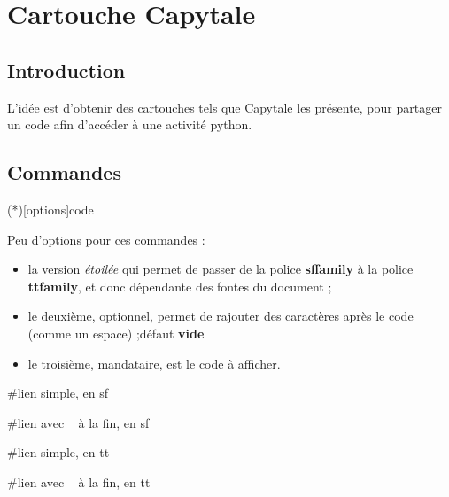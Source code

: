 \documentclass{article}
\newcommand\Cle[1]{{\bfseries\sffamily\textlangle #1\textrangle}}
\begin{document}
\newpage

\section{Cartouche Capytale}

\subsection{Introduction}

\begin{codeidee}
L'idée est d'obtenir des \textsf{cartouches} tels que \textsf{Capytale} les présente, pour partager un code afin d'accéder à une activité \textsf{python}.
\end{codeidee}

\subsection{Commandes}

\begin{codetex}
\liencapytale(*)[options]{code}
\end{codetex}

\begin{codecles}
Peu d'options pour ces commandes :

\begin{itemize}
	\item la version \textit{étoilée} qui permet de  passer de la police \Cle{sffamily} à la police \Cle{ttfamily}, et donc dépendante des fontes du document ;
	\item le deuxième, optionnel, permet de rajouter des caractères après le code (comme un \textsf{espace}) ;\hfill{}défaut \Cle{vide}
	\item le troisième, mandataire, est le \textsf{code} à afficher.
\end{itemize}
\end{codecles}

\begin{codetex}
           #lien simple, en sf

        #lien avec ~ à la fin, en sf

          #lien simple, en tt

       #lien avec ~ à la fin, en tt
\end{codetex}

\begin{codesortie}



\end{codesortie}
\end{document}
